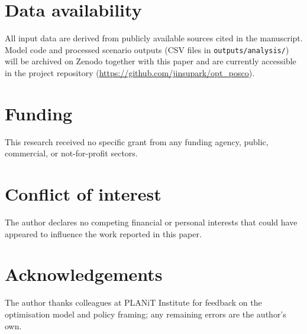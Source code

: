 \documentclass[preprint,1p,authoryear]{elsarticle}
\begin{document}






\section*{Data availability}
All input data are derived from publicly available sources cited in the manuscript. Model code and processed scenario outputs (CSV files in \texttt{outputs/analysis/}) will be archived on Zenodo together with this paper and are currently accessible in the project repository (\url{https://github.com/jinsupark/opt\_posco}).

\section*{Funding}
This research received no specific grant from any funding agency, public, commercial, or not-for-profit sectors.

\section*{Conflict of interest}
The author declares no competing financial or personal interests that could have appeared to influence the work reported in this paper.

\section*{Acknowledgements}
The author thanks colleagues at PLANiT Institute for feedback on the optimisation model and policy framing; any remaining errors are the author’s own.


\end{document}
